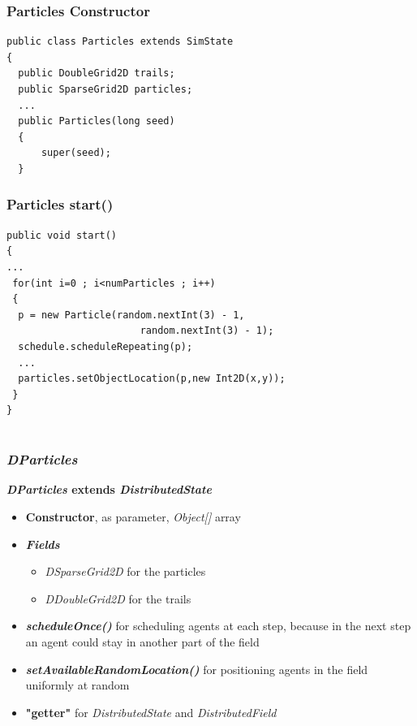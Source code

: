 \documentclass[]{beamer}
\begin{document}
\begin{frame}[fragile]
\frametitle{Particles Constructor}
\begin{lstlisting}
public class Particles extends SimState 
{
  public DoubleGrid2D trails;
  public SparseGrid2D particles;
  ...
  public Particles(long seed)
  {
      super(seed);
  }
\end{lstlisting}
\end{frame}

\begin{frame}[fragile]
\frametitle{Particles start()}
\begin{lstlisting}
public void start()
{
...
 for(int i=0 ; i<numParticles ; i++)
 {
  p = new Particle(random.nextInt(3) - 1,
                       random.nextInt(3) - 1);
  schedule.scheduleRepeating(p);
  ...
  particles.setObjectLocation(p,new Int2D(x,y)); 
 }
}
\end{lstlisting}
\end{frame}

\section[DParticles]{}

\begin{frame}
\frametitle{\textit{DParticles}}
\textbf{\textit{DParticles} extends \textit{DistributedState}}
\begin{itemize}
	\item \textbf{Constructor}, as parameter, \textit{Object[]} array
	\item\textbf{\textit{Fields}}
	\begin{itemize}
		\item \textit{DSparseGrid2D} for the particles
		\item  \textit{DDoubleGrid2D} for the trails
	\end{itemize}
	\item \textbf{\textit{scheduleOnce()}} for scheduling agents at each step, because in the next step an agent could stay in another part of the field
	\item \textbf{\textit{setAvailableRandomLocation()}} for positioning agents in the field uniformly at random
	\item \textbf{"getter"} for \textit{DistributedState} and \textit{DistributedField}
\end{itemize}
\end{frame}
\end{document}
